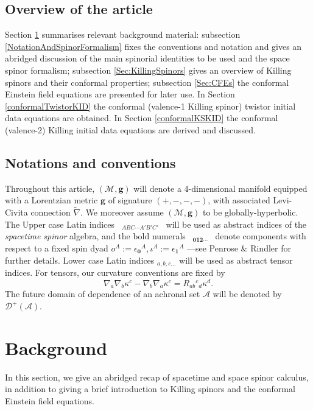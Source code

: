 \documentclass[10pt,a4paper]{article}
\theoremstyle{plain}
\def\bmg{{\bm g}}
\begin{document}
\subsection*{Overview of the article}
  Section \ref{Background} summarises relevant background material:
  subsection \ref{NotationAndSpinorFormalism} fixes the
conventions and notation and 
gives an abridged discussion of the main spinorial identities to be
used and the space spinor formalism;  subsection \ref{Sec:KillingSpinors}
gives an overview of Killing spinors and their conformal
properties; subsection \ref{Sec:CFEs}  the conformal
Einstein field equations are presented for later use.  In Section
\ref{conformalTwistorKID} the conformal (valence-1 Killing spinor)
twistor initial data equations are obtained. In Section
\ref{conformalKSKID} the conformal (valence-2) Killing initial data equations are
derived and discussed.


\subsection*{Notations and conventions}

Throughout this article, $(\mathcal{M}, \bmg)$ will denote a
4-dimensional manifold equipped with a Lorentzian metric $\bmg$ of
signature $(+, -, -, -)$, with associated Levi-Civita connection
$\tilde{\nabla}$.   We moreover assume $(\mathcal{M}, \bmg)$ to be
globally-hyperbolic. The Upper case Latin indices ~$_{ABC\cdots A'B'C'}$~
will be used as abstract indices of the \emph{spacetime spinor}
algebra, and the bold numerals ~$_{\bm0\bm1\bm2\cdots}$~ denote
components with respect to a fixed spin dyad $ o^A:=
\epsilon_{\bm0}{}^A,\iota^A:=\epsilon_{\bm1}{}^A $ ---see Penrose
\& Rindler \cite{PenRin84} for further details.
Lower case Latin indices $_{a,b,c...}$ will be used as abstract tensor
indices.  For tensors, our curvature conventions are fixed by
\[\nabla_{a}\nabla_{b}\kappa^c-\nabla_{b}\nabla_{a}\kappa^c=R_{ab}{}^{c}{}_{d}\kappa^{d}.\]
The future domain of dependence of an achronal set $\mathcal{A}$ will be denoted
by $\mathcal{D}^{+}(\mathcal{A})$.


\section{Background}
\label{Background}

In this section, we give an abridged recap of spacetime and space spinor
calculus, in addition to giving a brief introduction to Killing
spinors and the conformal Einstein field equations.
\end{document}
